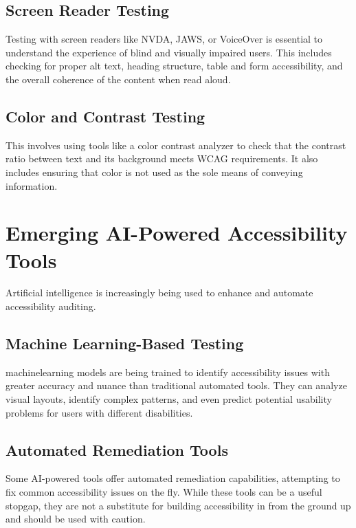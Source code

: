 \subsection{Screen Reader Testing}
\label{subsec:screen-reader-testing}
Testing with screen readers like NVDA, JAWS, or VoiceOver is essential to understand the experience of blind and visually impaired users. This includes checking for proper alt text, heading structure, table and form accessibility, and the overall coherence of the content when read aloud.
\supercite{WebAIM2023, WebAIMSurvey}

\subsection{Color and Contrast Testing}
\label{subsec:color-contrast-testing}
This involves using tools like a color contrast analyzer to check that the contrast ratio between text and its background meets WCAG requirements. It also includes ensuring that color is not used as the sole means of conveying information.
\supercite{WebAIMContrastChecker, WCAGContrast2018}

\section{Emerging AI-Powered Accessibility Tools}
\label{sec:ai-tools}
Artificial intelligence is increasingly being used to enhance and automate accessibility auditing.

\subsection{Machine Learning-Based Testing}
\label{subsec:ml-testing}
\gls{machinelearning} models are being trained to identify accessibility issues with greater accuracy and nuance than traditional automated tools. They can analyze visual layouts, identify complex patterns, and even predict potential usability problems for users with different disabilities.
\supercite{Evinced, Stark2024}

\subsection{Automated Remediation Tools}
\label{subsec:automated-remediation}
Some AI-powered tools offer automated remediation capabilities, attempting to fix common accessibility issues on the fly. While these tools can be a useful stopgap, they are not a substitute for building accessibility in from the ground up and should be used with caution.
\supercite{AccessiBe, UserWay2024}

